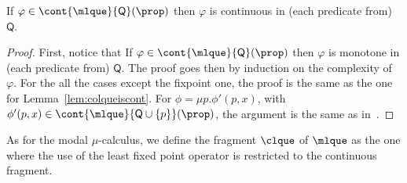 
\begin{lemma}\label{lem:colqueiscont_mu}
If $\varphi \in \cont{\mlque}{\mathsf{Q}}(\prop)$ then $\varphi$ is continuous in (each predicate from) $\mathsf{Q}$.
\end{lemma}
%
\begin{proof} First, notice that If $\varphi \in \cont{\mlque}{\mathsf{Q}}(\prop)$ then $\varphi$ is monotone  in (each predicate from) $\mathsf{Q}$. %
The proof goes then by induction on the complexity of $\varphi$. For the all the cases except the fixpoint one, the proof is the same as the one for Lemma~\ref{lem:colqueiscont}. For $\phi=\mu p. \phi'(p, x)$, with $\phi'(p,x) \in \cont{\mlque}{\mathsf{Q} \cup\{p\}}(\prop)$, the argument is the same as in~\cite[Lemma 1]{Fontaine08}.
\end{proof}


As for the modal $\mu$-calculus, we define the fragment $\clque$ of $\mlque$ as the one where the use of the least fixed point operator is restricted to the continuous fragment. %

